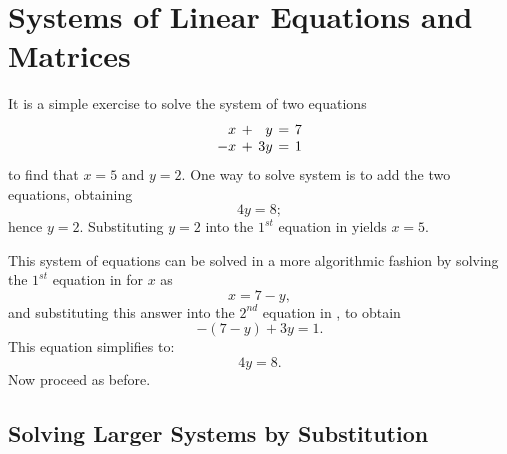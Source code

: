 \section{Systems of Linear Equations and Matrices}
\label{S:2.1}

It is a simple exercise to solve the system of two equations
\begin{equation} \label{small}
\arraycolsep 2pt
\begin{array}{rcrcr}
 x & + & y & = & 7 \\
-x & + & 3y & = & 1
\end{array}
\end{equation}
to find that $x=5$ and $y=2$.  One way to solve
system  is to add the two equations, obtaining
\[
4y=8;
\]
hence $y=2$.  Substituting $y=2$ into the $1^{st}$ equation in
 yields $x=5$.

This system of equations can be solved in a more algorithmic
fashion by solving the $1^{st}$ equation in  for $x$
as
\[
x = 7 - y,
\]
and substituting this answer into the $2^{nd}$ equation in
, to obtain
\[
-(7-y) +3y = 1.
\]
This equation simplifies to:
\[
4y = 8.
\]
Now proceed as before.

\subsection*{Solving Larger Systems by Substitution}

